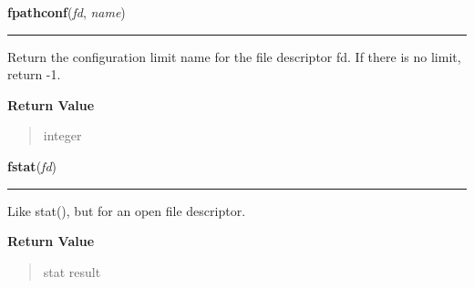 \hspace{.8\funcindent}\begin{boxedminipage}{\funcwidth}

    \raggedright \textbf{fpathconf}(\textit{fd}, \textit{name})

    \vspace{-1.5ex}

    \rule{\textwidth}{0.5\fboxrule}
\setlength{\parskip}{2ex}
    Return the configuration limit name for the file descriptor fd. If 
    there is no limit, return -1.

\setlength{\parskip}{1ex}
      \textbf{Return Value}
    \vspace{-1ex}

      \begin{quote}
      integer

      \end{quote}

    \end{boxedminipage}

    \label{os:fstat}

    \vspace{0.5ex}

\hspace{.8\funcindent}\begin{boxedminipage}{\funcwidth}

    \raggedright \textbf{fstat}(\textit{fd})

    \vspace{-1.5ex}

    \rule{\textwidth}{0.5\fboxrule}
\setlength{\parskip}{2ex}
    Like stat(), but for an open file descriptor.

\setlength{\parskip}{1ex}
      \textbf{Return Value}
    \vspace{-1ex}

      \begin{quote}
      stat result

      \end{quote}

    \end{boxedminipage}

    \label{os:fstatvfs}

    \vspace{0.5ex}

